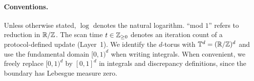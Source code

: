 \paragraph{Conventions.}
Unless otherwise stated, $\log$ denotes the natural logarithm. ``mod $1$'' refers to reduction in $\mathbb{R}/\mathbb{Z}$. The scan time $t\in\mathbb{Z}_{\ge 0}$ denotes an iteration count of a protocol-defined update (Layer~1). We identify the $d$-torus with $\mathbb{T}^d=(\mathbb{R}/\mathbb{Z})^d$ and use the fundamental domain $[0,1)^d$ when writing integrals.
When convenient, we freely replace $[0,1)^d$ by $[0,1]^d$ in integrals and discrepancy definitions, since the boundary has Lebesgue measure zero.

\tableofcontents
\newpage


